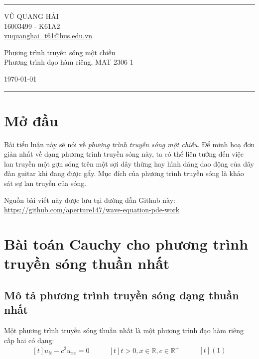 \documentclass[a4paper]{article}
\begin{document}

\fancyhead[C]{}
\hrule \medskip %
\begin{minipage}{0.295\textwidth} 
\raggedright
\footnotesize
VŨ QUANG HẢI \hfill\\
16003499 - K61A2\hfill\\
\href{mailto: vuquanghai_t61@hus.edu.vn}{vuquanghai\_t61@hus.edu.vn}
\end{minipage}
\begin{minipage}{0.4\textwidth}
\centering 
\large 
Phương trình truyền sóng một chiều \\ 
\normalsize 
Phương trình đạo hàm riêng, MAT 2306 1 \\ 
\end{minipage}
\begin{minipage}{0.295\textwidth} 
\raggedleft
\today\hfill\\
\end{minipage}
\medskip\hrule 
\bigskip


\section{Mở đầu}
Bài tiểu luận này sẽ nói về \emph{phương trình truyền sóng một chiều}. Để minh hoạ đơn giản nhất về dạng phương trình truyền sóng này, ta có thể liên tưởng đến việc lan truyền một gợn sóng trên một sợi dây thừng hay hình dáng dao động của dây đàn guitar khi đang được gẩy. Mục đích của phương trình truyền sóng là khảo sát sự lan truyền của sóng.

Nguồn bài viết này được lưu tại đường dẫn Github này: \url{https://github.com/aperture147/wave-equation-pde-work}

\section{Bài toán Cauchy cho phương trình truyền sóng thuần nhất}
\subsection{Mô tả phương trình truyền sóng dạng thuần nhất}

Một phương trình truyền sóng thuần nhất là một phương trình đạo hàm riêng cấp hai có dạng:
\begin{equation*}
\begin{aligned}[t]
u_{tt} - c^2u_{xx} = 0
\end{aligned}
\qquad
\begin{aligned}[t]
t > 0, x \in \mathbb{R}, c \in \mathbb{R}^+
\end{aligned}
\qquad
\begin{aligned}[t]
(1)
\end{aligned}
\end{equation*}
\end{document}
